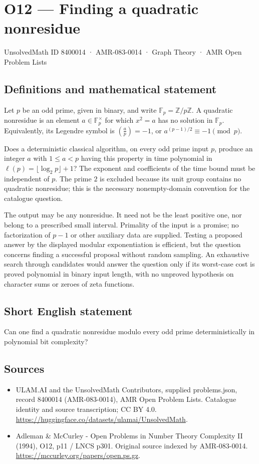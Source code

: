 \documentclass[11pt,a4paper]{article}
\begin{document}
\section*{O12 — Finding a quadratic nonresidue}\label{8400014}
{\small UnsolvedMath ID 8400014 · AMR-083-0014 · Graph Theory · AMR Open Problem Lists}
\subsection{Definitions and mathematical statement}
Let $p$ be an odd prime, given in binary, and write $\mathbb F_p=\mathbb Z/p\mathbb Z$. A quadratic nonresidue is an element $a\in\mathbb F_p^\times$ for which $x^2=a$ has no solution in $\mathbb F_p$. Equivalently, its Legendre symbol is $\left(\frac ap\right)=-1$, or $a^{(p-1)/2}\equiv-1\pmod p$.

Does a deterministic classical algorithm, on every odd prime input $p$, produce an integer $a$ with $1\le a<p$ having this property in time polynomial in $\ell(p)=\lfloor\log_2p\rfloor+1$? The exponent and coefficients of the time bound must be independent of $p$. The prime $2$ is excluded because its unit group contains no quadratic nonresidue; this is the necessary nonempty-domain convention for the catalogue question.

The output may be any nonresidue. It need not be the least positive one, nor belong to a prescribed small interval. Primality of the input is a promise; no factorization of $p-1$ or other auxiliary data are supplied. Testing a proposed answer by the displayed modular exponentiation is efficient, but the question concerns finding a successful proposal without random sampling. An exhaustive search through candidates would answer the question only if its worst-case cost is proved polynomial in binary input length, with no unproved hypothesis on character sums or zeroes of zeta functions.
\subsection{Short English statement}
Can one find a quadratic nonresidue modulo every odd prime deterministically in polynomial bit complexity?
\subsection{Sources}
\begin{itemize}
\item[S1] ULAM.AI and the UnsolvedMath Contributors, supplied problems.json, record 8400014 (AMR-083-0014), AMR Open Problem Lists. Catalogue identity and source transcription; CC BY 4.0.
\url{https://huggingface.co/datasets/ulamai/UnsolvedMath}.
\item[S2] Adleman \& McCurley - Open Problems in Number Theory Complexity II (1994), O12, p11 / LNCS p301. Original source indexed by AMR-083-0014.
\url{https://mccurley.org/papers/open.ps.gz}.
\end{itemize}
\end{document}
